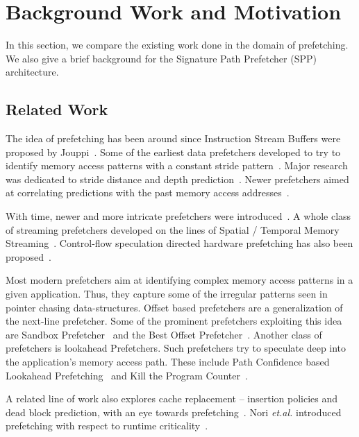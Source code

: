 \section{Background Work and Motivation}
\label{Background}

In this section, we compare the existing work done in the domain of
prefetching.  We also give a brief background for the 
Signature Path Prefetcher (SPP) architecture.

\subsection{Related Work}
\label{Background-Related}
The idea of prefetching has been around since Instruction Stream
Buffers were proposed by Jouppi~\cite{ISB}. Some of the earliest data
prefetchers developed to try to identify memory access patterns with a
constant stride pattern~\cite{Smith,Baer,Stride}. Major research was
dedicated to stride distance and depth prediction~\cite{Decoupled,Adaptive}. Newer prefetchers aimed at correlating
predictions with the past memory access addresses~\cite{Address_Correlated,AMPM}.

With time, newer and more intricate prefetchers were
introduced~\cite{Wenisch_Temporal_Streaming,Stealth,Feedback_Directed,Coordinated,Bandwidth_Efficient,Pacman,TLB,Linearizing,Sandbox,VLDP,DoL,Domino}.
A whole class of streaming prefetchers developed on the lines of Spatial /
Temporal Memory
Streaming~\cite{Spatial_Pattern,SMS,Temporal_Instruction_Fetch,Off_Chip,STMS,SMS_JILP}.
Control-flow speculation directed hardware prefetching has also been
proposed~\cite{BFetch,MTBFetch}.

Most modern prefetchers aim at identifying complex memory access patterns in a
given application.  Thus, they capture some of the irregular patterns seen in
pointer chasing data-structures.  Offset based prefetchers are a
generalization of the next-line prefetcher.  Some of the prominent prefetchers
exploiting this idea are Sandbox Prefetcher~\cite{Sandbox} and the Best Offset
Prefetcher~\cite{BOP}.  Another class of prefetchers is lookahead Prefetchers.
Such prefetchers try to speculate deep into the application's memory access
path.  These include Path Confidence based Lookahead Prefetching~\cite{SPP}
and Kill the Program Counter~\cite{KPC}.

A related line of work also explores cache replacement -- insertion policies
and dead block prediction, with an eye towards
prefetching~\cite{DB_Pred,Cache_Burst,KPC,Harmony}.  Nori \textit{et.al.}
introduced prefetching with respect to runtime criticality~\cite{CATCH}.

